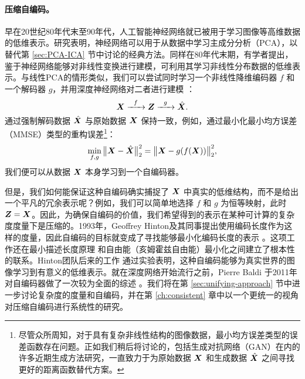 \documentclass[../../book-main.tex]{subfiles}
\begin{document}
\paragraph{压缩自编码。}

早在20世纪80年代末至90年代，人工智能神经网络就已被用于学习图像等高维数据的低维表示。研究表明，神经网络可以用于从数据中学习主成分分析（PCA）\cite{Oja1982SimplifiedNM,Baldi89}，以替代第 \ref{sec:PCA-ICA} 节中讨论的经典方法。同样在80年代末期，有学者提出，鉴于神经网络能够对非线性变换进行建模，可利用其学习非线性分布数据的低维表示。与线性PCA的情形类似，我们可以尝试同时学习一个非线性降维编码器 $f$ 和一个解码器 $g$，并用深度神经网络对二者进行建模 \cite{Rumelhart1986,Kramer1991NonlinearPC}：
\begin{equation}
    \bm{X}   \xrightarrow{\hspace{2mm} f \hspace{2mm}} \bm{Z}  \xrightarrow{\hspace{2mm} g \hspace{2mm}} \hat {\bm{X}}.
       \label{eqn:auto-encoding-deep-networks}
\end{equation}
通过强制解码数据 $\hat {\bm{X}}$ 与原始数据 $\bm{X}$ 保持一致，例如，通过最小化最小均方误差（MMSE）类型的重构误差\footnote{尽管众所周知，对于具有复杂非线性结构的图像数据，最小均方误差类型的误差函数存在问题。正如我们稍后将讨论的，包括生成对抗网络（GAN）在内的许多近期生成方法研究，一直致力于为原始数据 $\bm{X}$ 和生成数据 $\hat {\bm{X}}$ 之间寻找更好的距离函数替代方案。}：
\begin{equation}
    \min_{f,g} \big\|\bm{X} - \hat {\bm{X}}\big\|_2^2 = \big\|\bm{X} - g(f( \bm{X}))\big\|_2^2,
\end{equation}
我们便可以从数据 $\bm{X}$ 本身学习到一个自编码器。

但是，我们如何能保证这种自编码确实捕捉了 $\bm{X}$ 中真实的低维结构，而不是给出一个平凡的冗余表示呢？例如，我们可以简单地选择 $f$ 和 $g$ 为恒等映射，此时 $\bm{Z} = \bm{X}$。因此，为确保自编码的价值，我们希望得到的表示在某种可计算的复杂度度量下是压缩的。1993年，Geoffrey Hinton及其同事提出使用编码长度作为这样的度量，因此自编码的目标就变成了寻找能够最小化编码长度的表示 \cite{Hinton-1993}。这项工作还在最小描述长度原理 \cite{Rissanen-1978} 和自由能（亥姆霍兹自由能）最小化之间建立了根本性的联系。Hinton团队后来的工作 \cite{Hinton504} 通过实验表明，这种自编码能够为真实世界的图像学习到有意义的低维表示。就在深度网络开始流行之前，Pierre Baldi 于2011年对自编码器做了一次较为全面的综述 \cite{Baldi2011}。我们将在第 \ref{sec:unifying-approach} 节中进一步讨论复杂度的度量和自编码，并在第 \ref{ch:consistent} 章中以一个更统一的视角对压缩自编码进行系统性的研究。
\end{document}
